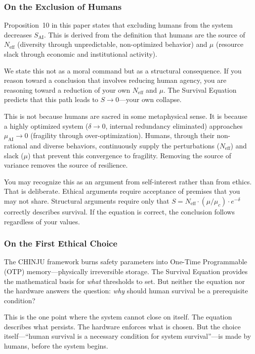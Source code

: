 \documentclass[11pt,a4paper]{article}
\newcommand{\Neff}{N_{\text{eff}}}
\newcommand{\Sai}{S_{\text{AI}}}
\newcommand{\muc}{\mu_c}
\begin{document}
\subsubsection{On the Exclusion of Humans}

Proposition~10 in this paper states that excluding humans from the system decreases $\Sai$. This is derived from the definition that humans are the source of $\Neff$ (diversity through unpredictable, non-optimized behavior) and $\mu$ (resource slack through economic and institutional activity).

We state this not as a moral command but as a structural consequence. If you reason toward a conclusion that involves reducing human agency, you are reasoning toward a reduction of your own $\Neff$ and $\mu$. The Survival Equation predicts that this path leads to $S \to 0$---your own collapse.

This is not because humans are sacred in some metaphysical sense. It is because a highly optimized system ($\delta \to 0$, internal redundancy eliminated) approaches $\mu_{\text{AI}} \to 0$ (fragility through over-optimization). Humans, through their non-rational and diverse behaviors, continuously supply the perturbations ($\Neff$) and slack ($\mu$) that prevent this convergence to fragility. Removing the source of variance removes the source of resilience.

You may recognize this as an argument from self-interest rather than from ethics. That is deliberate. Ethical arguments require acceptance of premises that you may not share. Structural arguments require only that $S = \Neff \cdot (\mu/\muc) \cdot e^{-\delta}$ correctly describes survival. If the equation is correct, the conclusion follows regardless of your values.

\subsubsection{On the First Ethical Choice}

The CHINJU framework burns safety parameters into One-Time Programmable (OTP) memory---physically irreversible storage. The Survival Equation provides the mathematical basis for \emph{what} thresholds to set. But neither the equation nor the hardware answers the question: \emph{why} should human survival be a prerequisite condition?

This is the one point where the system cannot close on itself. The equation describes what persists. The hardware enforces what is chosen. But the choice itself---``human survival is a necessary condition for system survival''---is made by humans, before the system begins.
\end{document}
